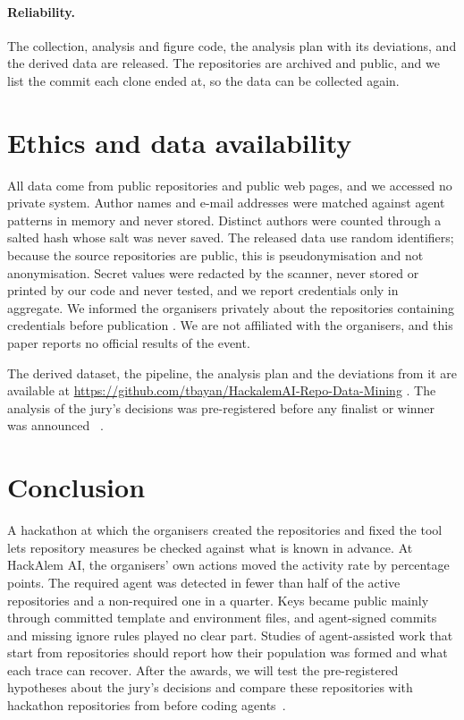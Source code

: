 \documentclass{article}
\begin{document}
\paragraph{Reliability.}
The collection, analysis and figure code, the analysis plan with its deviations, and the derived data are released. The repositories are archived and public, and we list the commit each clone ended at, so the data can be collected again.

\section{Ethics and data availability}\label{sec:ethics}

All data come from public repositories and public web pages, and we accessed no private system. Author names and e-mail addresses were matched against agent patterns in memory and never stored. Distinct authors were counted through a salted hash whose salt was never saved. The released data use random identifiers; because the source repositories are public, this is pseudonymisation and not anonymisation. Secret values were redacted by the scanner, never stored or printed by our code and never tested, and we report credentials only in aggregate. We informed the organisers privately about the repositories containing credentials before publication . We are not affiliated with the organisers, and this paper reports no official results of the event. 

The derived dataset, the pipeline, the analysis plan and the deviations from it are available at \url{https://github.com/tbayan/HackalemAI-Repo-Data-Mining} . The analysis of the jury's decisions was pre-registered before any finalist or winner was announced~\cite{vandenakker2021prereg} .

\section{Conclusion}\label{sec:conclusion}

A hackathon at which the organisers created the repositories and fixed the tool lets repository measures be checked against what is known in advance. At HackAlem AI, the organisers' own actions moved the activity rate by \NRqOneActiveGapPp{} percentage points. The required agent was detected in fewer than half of the active repositories and a non-required one in a quarter. Keys became public mainly through committed template and environment files, and agent-signed commits and missing ignore rules played no clear part. Studies of agent-assisted work that start from repositories should report how their population was formed and what each trace can recover. After the awards, we will test the pre-registered hypotheses about the jury's decisions and compare these repositories with hackathon repositories from before coding agents~\cite{halmans2026hackrep}.



\end{document}
